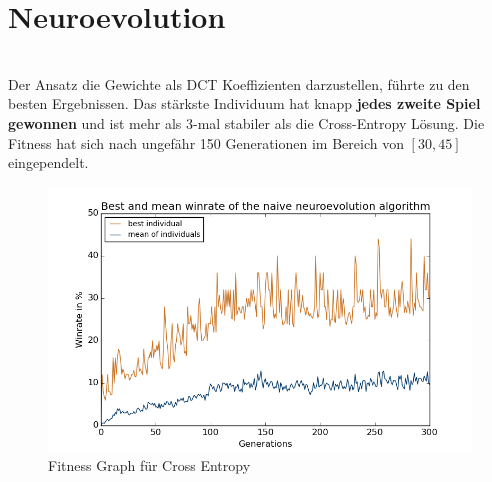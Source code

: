             \section{Neuroevolution}
                \begin{multicols}{2}
                    \noindent
                    \\[5mm]
                    Der Ansatz die Gewichte als DCT Koeffizienten darzustellen, führte zu den besten Ergebnissen. Das stärkste Individuum hat knapp \textbf{jedes zweite Spiel gewonnen} und ist mehr als 3-mal stabiler als die Cross-Entropy Lösung. Die Fitness hat sich nach ungefähr 150 Generationen im Bereich von $[30,45]$ eingependelt.
                    \begin{figure}[H]
                       \includegraphics[scale=0.5]{../pictures/summary/neural-fitness.png}
                       \caption{Fitness Graph für Cross Entropy}\label{fig:graph-ne}
                    \end{figure}
                \end{multicols}

